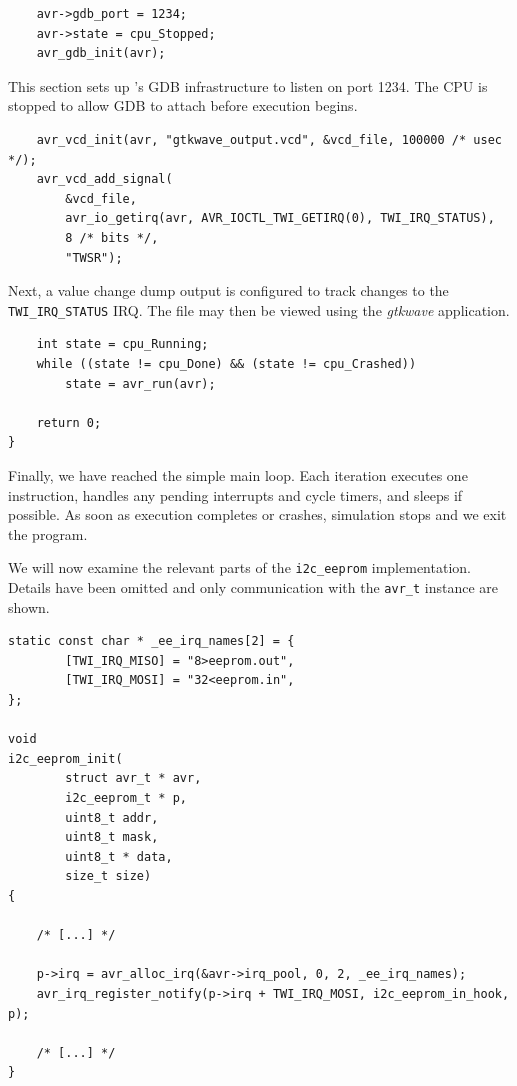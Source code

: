 \begin{lstlisting}
    avr->gdb_port = 1234;
    avr->state = cpu_Stopped;
    avr_gdb_init(avr);
\end{lstlisting}

This section sets up \simavr's \ac{GDB} infrastructure to listen on port 1234. The
\ac{CPU} is stopped to allow \ac{GDB} to attach before execution begins.

\begin{lstlisting}
    avr_vcd_init(avr, "gtkwave_output.vcd", &vcd_file, 100000 /* usec */);
    avr_vcd_add_signal(
        &vcd_file,
        avr_io_getirq(avr, AVR_IOCTL_TWI_GETIRQ(0), TWI_IRQ_STATUS),
        8 /* bits */,
        "TWSR");
\end{lstlisting}

Next, a value change dump output is configured to track changes to the
\lstinline|TWI_IRQ_STATUS| \ac{IRQ}. The file may then be viewed using the \emph{gtkwave}
application.

\begin{lstlisting}
    int state = cpu_Running;
    while ((state != cpu_Done) && (state != cpu_Crashed))
        state = avr_run(avr);

    return 0;
}
\end{lstlisting}

Finally, we have reached the simple main loop. Each iteration executes one
instruction, handles any pending interrupts and cycle timers, and sleeps if
possible. As soon as execution completes or crashes, simulation stops and we
exit the program.

We will now examine the relevant parts of the \lstinline|i2c_eeprom| implementation.
Details have been omitted and only communication with the \lstinline|avr_t| instance are
shown.

\begin{lstlisting}
static const char * _ee_irq_names[2] = {
		[TWI_IRQ_MISO] = "8>eeprom.out",
		[TWI_IRQ_MOSI] = "32<eeprom.in",
};

void
i2c_eeprom_init(
		struct avr_t * avr,
		i2c_eeprom_t * p,
		uint8_t addr,
		uint8_t mask,
		uint8_t * data,
		size_t size)
{

    /* [...] */

	p->irq = avr_alloc_irq(&avr->irq_pool, 0, 2, _ee_irq_names);
	avr_irq_register_notify(p->irq + TWI_IRQ_MOSI, i2c_eeprom_in_hook, p);

    /* [...] */
}
\end{lstlisting}

